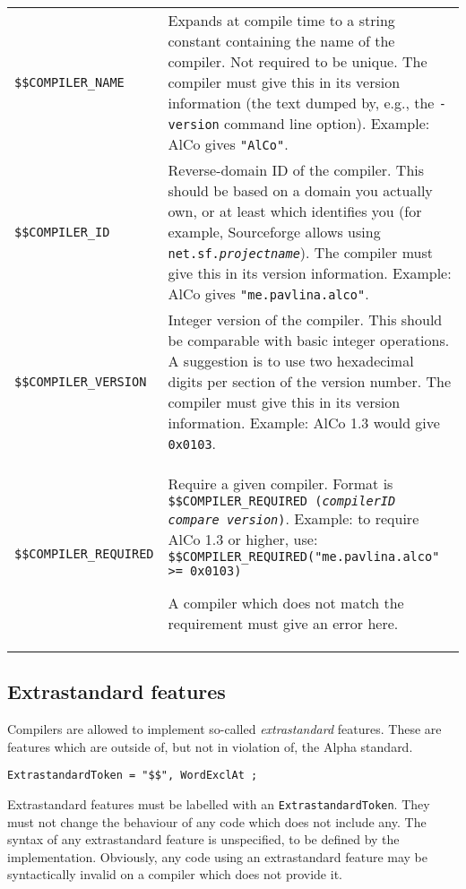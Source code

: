 \documentclass{article}
\begin{document}
\begin{center}
\begin{tabular}{|l|p{4in}|}
\hline
\texttt{\$\$COMPILER\_NAME} & Expands at compile time to a string constant
  containing the name of the compiler. Not required to be unique. The compiler
  must give this in its version information (the text dumped by, e.g., the
  \texttt{-version} command line option). Example: AlCo gives
  \texttt{"AlCo"}. \\
\texttt{\$\$COMPILER\_ID} & Reverse-domain ID of the compiler. This should be
  based on a domain you actually own, or at least which identifies you
  (for example, Sourceforge allows using \texttt{net.sf.{\it projectname}}).
  The compiler must give this in its version information.
  Example: AlCo gives \texttt{"me.pavlina.alco"}. \\
\texttt{\$\$COMPILER\_VERSION} & Integer version of the compiler. This should
  be comparable with basic integer operations. A suggestion is to use two
  hexadecimal digits per section of the version number. The compiler must give
  this in its version information.
  Example: AlCo 1.3 would give \texttt{0x0103}. \\
\texttt{\$\$COMPILER\_REQUIRED} & Require a given compiler. Format is
  \texttt{\$\$COMPILER\_REQUIRED ({\it compilerID} {\it compare}
  {\it version})}. Example: to require AlCo 1.3 or higher, use:
  \texttt{\$\$COMPILER\_REQUIRED("me.pavlina.alco" >= 0x0103)}

  A compiler which does not match the requirement must give an error here. \\
\hline
\end{tabular}
\end{center}

\subsection{Extrastandard features}
\label{sub:implementation:extrastandard}
Compilers are allowed to implement so-called {\it extrastandard} features. These
are features which are outside of, but not in violation of, the Alpha standard.

\begin{verbatim}
ExtrastandardToken = "$$", WordExclAt ;
\end{verbatim}

Extrastandard features must be labelled with an \texttt{ExtrastandardToken}.
They must not change the behaviour of any code which does not include any.
The syntax of any extrastandard feature is unspecified, to be defined by the
implementation. Obviously, any code using an extrastandard feature may be
syntactically invalid on a compiler which does not provide it.
\end{document}
